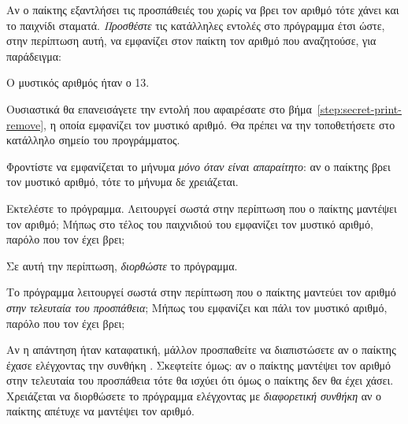 \documentclass[a4paper,11pt,oneside]{book}
\begin{document}

\begin{step}
Αν ο παίκτης εξαντλήσει τις προσπάθειές του χωρίς να βρει τον αριθμό τότε χάνει και το παιχνίδι σταματά. \emph{Προσθέστε} τις κατάλληλες εντολές στο πρόγραμμα έτσι ώστε, στην περίπτωση αυτή, να εμφανίζει στον παίκτη τον αριθμό που αναζητούσε, για παράδειγμα:

\marginnote[14pt]{\iconcomputer}
\begin{pyterm}
Ο μυστικός αριθμός ήταν ο 13.
\end{pyterm}

\begin{note}
Ουσιαστικά θα επανεισάγετε την εντολή που αφαιρέσατε στο βήμα~\ref{step:secret-print-remove}, η οποία εμφανίζει τον μυστικό αριθμό. Θα πρέπει να την τοποθετήσετε στο κατάλληλο σημείο του προγράμματος.
\end{note} 

Φροντίστε να εμφανίζεται το μήνυμα \emph{μόνο όταν είναι απαραίτητο}: αν ο παίκτης βρει τον μυστικό αριθμό, τότε το μήνυμα δε χρειάζεται.

Εκτελέστε το πρόγραμμα. Λειτουργεί σωστά στην περίπτωση που ο παίκτης μαντέψει τον αριθμό; Μήπως στο τέλος του παιχνιδιού του εμφανίζει τον μυστικό αριθμό, παρόλο που τον έχει βρει;

\marginnote[14pt]{\icondiscuss}
\dottedline

Σε αυτή την περίπτωση, \emph{διορθώστε} το πρόγραμμα.

Tο πρόγραμμα λειτουργεί σωστά στην περίπτωση που ο παίκτης μαντεύει τον αριθμό \emph{στην τελευταία του προσπάθεια}; Μήπως του εμφανίζει και πάλι τον μυστικό αριθμό, παρόλο που τον έχει βρει;

\marginnote[14pt]{\icondiscuss}
\dottedline

Αν η απάντηση ήταν καταφατική, μάλλον προσπαθείτε να διαπιστώσετε αν ο παίκτης έχασε ελέγχοντας την συνθήκη . Σκεφτείτε όμως: αν ο παίκτης μαντέψει τον αριθμό στην τελευταία του προσπάθεια τότε θα ισχύει ότι  όμως ο παίκτης δεν θα έχει χάσει. Χρειάζεται να διορθώσετε το πρόγραμμα ελέγχοντας με \emph{διαφορετική συνθήκη} αν ο παίκτης απέτυχε να μαντέψει τον αριθμό.
\end{step}
\end{document}
